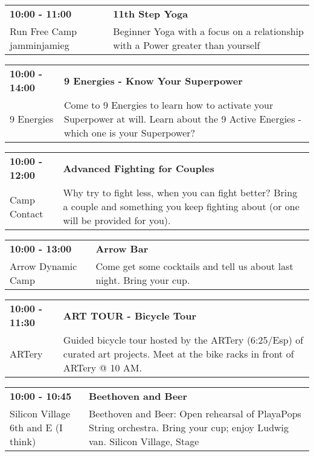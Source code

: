 \begin{tabular}{ p{1in} p{2.2in} }
    \textbf{10:00 - 11:00} & \textbf{11th Step Yoga} \\
    Run Free Camp \newline jamminjamieg & Beginner Yoga with a focus on a relationship with a Power greater than yourself \\
    \hline 
\end{tabular}
    
\begin{tabular}{ p{1in} p{2.2in} }
    \textbf{10:00 - 14:00} & \textbf{9 Energies - Know Your Superpower} \\
    9 Energies \newline  & Come to 9 Energies to learn how to activate your Superpower at will. Learn about the 9 Active Energies - which one is your Superpower? \\
    \hline 
\end{tabular}
    
\begin{tabular}{ p{1in} p{2.2in} }
    \textbf{10:00 - 12:00} & \textbf{Advanced Fighting for Couples} \\
    Camp Contact \newline  & Why try to fight less, when you can fight better? Bring a couple and something you keep fighting about (or one will be provided for you). \\
    \hline 
\end{tabular}
    
\begin{tabular}{ p{1in} p{2.2in} }
    \textbf{10:00 - 13:00} & \textbf{Arrow Bar} \\
    Arrow Dynamic Camp \newline  & Come get some cocktails and tell us about last night. Bring your cup. \\
    \hline 
\end{tabular}
    
\begin{tabular}{ p{1in} p{2.2in} }
    \textbf{10:00 - 11:30} & \textbf{ART TOUR - Bicycle Tour} \\
    ARTery \newline  & Guided bicycle tour hosted by the ARTery (6:25/Esp) of curated art projects.   Meet at the bike racks in front of ARTery @ 10 AM. \\
    \hline 
\end{tabular}
    
\begin{tabular}{ p{1in} p{2.2in} }
    \textbf{10:00 - 10:45} & \textbf{Beethoven and Beer} \\
    Silicon Village \newline 6th and E (I think) & Beethoven and Beer:  Open rehearsal of PlayaPops String orchestra.  Bring your cup; enjoy Ludwig van. Silicon Village, Stage \\
    \hline 
\end{tabular}
    
